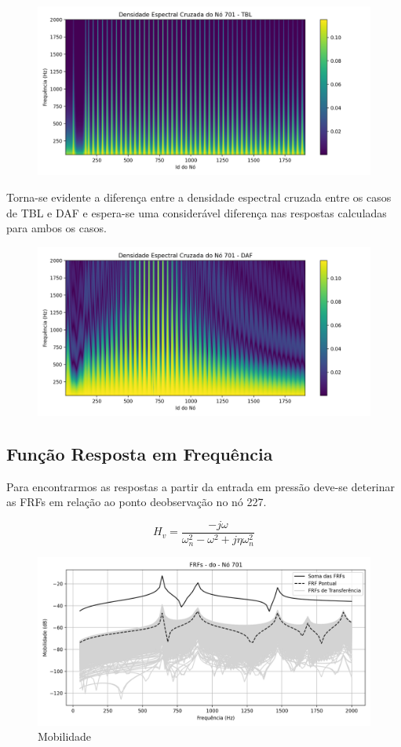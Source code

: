 \documentclass[9pt,a4paper,twoside]{rho-class/rho}
\begin{document}
\begin{figure}[H]
	\centering
	\includegraphics[width=0.9\columnwidth]{figures/csd_TBL.png}
	\caption{}
	\label{fig:csdTBL}
\end{figure}
Torna-se evidente a diferença entre a densidade espectral cruzada entre os casos de TBL e DAF e espera-se uma considerável diferença nas respostas calculadas para ambos os casos.
\begin{figure}[H]
	\centering
	\includegraphics[width=0.9\columnwidth]{figures/csd_DAF.png}
	\caption{}
	\label{fig:csdDAF}
\end{figure}

\subsection{Função Resposta em Frequência}
Para encontrarmos as respostas a partir da entrada em pressão  deve-se deterinar as FRFs em relação ao ponto deobservação no nó 227.

\begin{equation}
	H_v = \frac{-j\omega}{\omega_n^2-\omega^2+j\eta\omega_n^2}
\end{equation}
\begin{figure}[H]
	\centering
	\includegraphics[width=0.9\columnwidth]{figures/frfs.png}
	\caption{Mobilidade}
	\label{fig:frf}
\end{figure}
\end{document}
